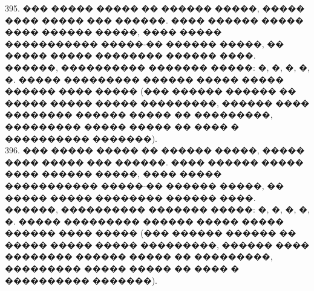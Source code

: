 \documentclass[12pt]{article}
\begin{document}
395. ��� ����� ����� �� ������ �����, ����� ���� ����� ��� ������. ���� ������ ����� ���� ������ �����, ���� ����� ����������� �����-�� ������ �����, �� ����� ����� �������� ������ ����. ������, ���������� ������� �����: �, �, �, �, �. ����� ��������� ������ ����� ����� ������ ���� ����� (��� ������ ������ �� ����� ����� ����� ���������, ������ ���� �������� ������ ����� �� ���������, ��������� ����� ����� �� ���� � ���������� �������).\\
396. ��� ����� ����� �� ������ �����, ����� ���� ����� ��� ������. ���� ������ ����� ���� ������ �����, ���� ����� ����������� �����-�� ������ �����, �� ����� ����� �������� ������ ����. ������, ���������� ������� �����: �, �, �, �, �. ����� ��������� ������ ����� ����� ������ ���� ����� (��� ������ ������ �� ����� ����� ����� ���������, ������ ���� �������� ������ ����� �� ���������, ��������� ����� ����� �� ���� � ���������� �������).
\end{document}
